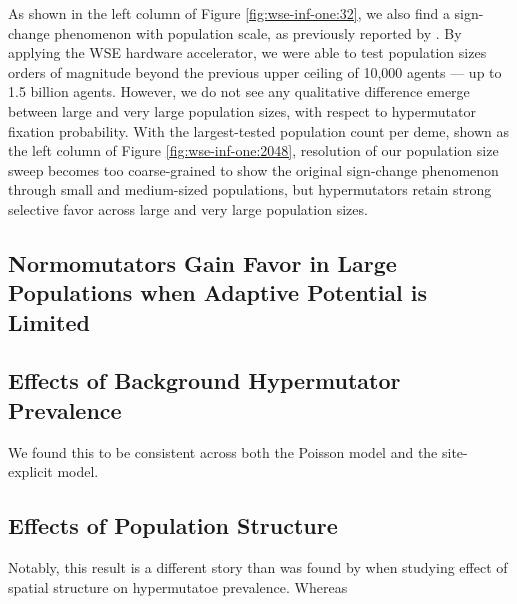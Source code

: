 As shown in the left column of Figure \ref{fig:wse-inf-one:32}, we also find a sign-change phenomenon with population scale, as previously reported by \citet{raynes2018sign}.
By applying the WSE hardware accelerator, we were able to test population sizes orders of magnitude beyond the previous upper ceiling of 10,000 agents --- up to 1.5 billion agents.
However, we do not see any qualitative difference emerge between large and very large population sizes, with respect to hypermutator fixation probability.
With the largest-tested population count per deme, shown as the left column of Figure \ref{fig:wse-inf-one:2048}, resolution of our population size sweep becomes too coarse-grained to show the original sign-change phenomenon through small and medium-sized populations, but hypermutators retain strong selective favor across large and very large population sizes.

\subsection{Normomutators Gain Favor in Large Populations when Adaptive Potential is Limited}



\subsection{Effects of Background Hypermutator Prevalence}
\label{sec:background-hypermutator-prevalence}



We found this to be consistent across both the Poisson model and the site-explicit model.

\subsection{Effects of Population Structure}
\label{sec:population-structure}



Notably, this result is a different story than was found by \citet{raynes2019migration} when studying effect of spatial structure on hypermutatoe prevalence.
Whereas
